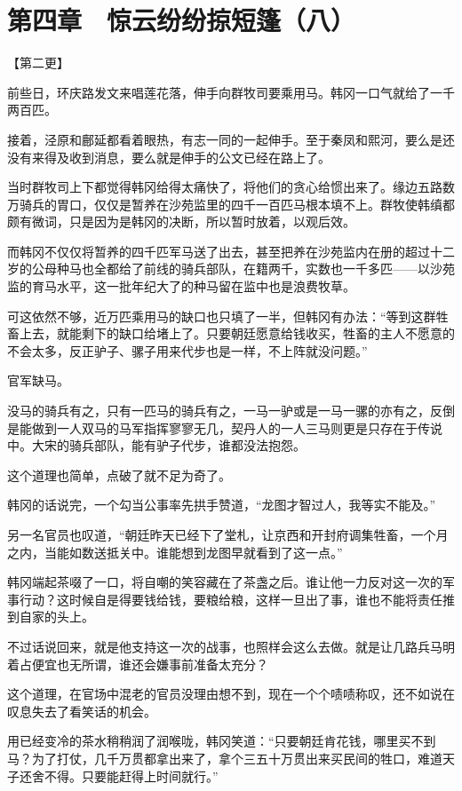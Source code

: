 \section{第四章　惊云纷纷掠短篷（八）}

【第二更】

前些日，环庆路发文来唱莲花落，伸手向群牧司要乘用马。韩冈一口气就给了一千两百匹。

接着，泾原和鄜延都看着眼热，有志一同的一起伸手。至于秦凤和熙河，要么是还没有来得及收到消息，要么就是伸手的公文已经在路上了。

当时群牧司上下都觉得韩冈给得太痛快了，将他们的贪心给惯出来了。缘边五路数万骑兵的胃口，仅仅是暂养在沙苑监里的四千一百匹马根本填不上。群牧使韩缜都颇有微词，只是因为是韩冈的决断，所以暂时放着，以观后效。

而韩冈不仅仅将暂养的四千匹军马送了出去，甚至把养在沙苑监内在册的超过十二岁的公母种马也全都给了前线的骑兵部队，在籍两千，实数也一千多匹——以沙苑监的育马水平，这一批年纪大了的种马留在监中也是浪费牧草。

可这依然不够，近万匹乘用马的缺口也只填了一半，但韩冈有办法：“等到这群牲畜上去，就能剩下的缺口给堵上了。只要朝廷愿意给钱收买，牲畜的主人不愿意的不会太多，反正驴子、骡子用来代步也是一样，不上阵就没问题。”

官军缺马。

没马的骑兵有之，只有一匹马的骑兵有之，一马一驴或是一马一骡的亦有之，反倒是能做到一人双马的马军指挥寥寥无几，契丹人的一人三马则更是只存在于传说中。大宋的骑兵部队，能有驴子代步，谁都没法抱怨。

这个道理也简单，点破了就不足为奇了。

韩冈的话说完，一个勾当公事率先拱手赞道，“龙图才智过人，我等实不能及。”

另一名官员也叹道，“朝廷昨天已经下了堂札，让京西和开封府调集牲畜，一个月之内，当能如数送抵关中。谁能想到龙图早就看到了这一点。”

韩冈端起茶啜了一口，将自嘲的笑容藏在了茶盏之后。谁让他一力反对这一次的军事行动？这时候自是得要钱给钱，要粮给粮，这样一旦出了事，谁也不能将责任推到自家的头上。

不过话说回来，就是他支持这一次的战事，也照样会这么去做。就是让几路兵马明着占便宜也无所谓，谁还会嫌事前准备太充分？

这个道理，在官场中混老的官员没理由想不到，现在一个个啧啧称叹，还不如说在叹息失去了看笑话的机会。

用已经变冷的茶水稍稍润了润喉咙，韩冈笑道：“只要朝廷肯花钱，哪里买不到马？为了打仗，几千万贯都拿出来了，拿个三五十万贯出来买民间的牲口，难道天子还舍不得。只要能赶得上时间就行。”

